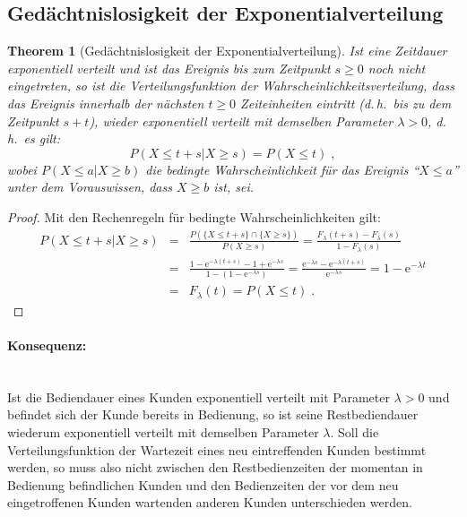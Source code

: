 \documentclass[a4paper,11pt,oneside]{article}
\newtheorem{theorem}{Theorem}
\theoremstyle{definition}
\begin{document}
\subsection{Gedächtnislosigkeit der Exponentialverteilung}

\begin{theorem}[Gedächtnislosigkeit der Exponentialverteilung]
Ist eine Zeitdauer exponentiell verteilt und ist das Ereignis bis zum Zeitpunkt $s\ge0$ noch nicht eingetreten, so ist die Verteilungsfunktion der Wahrscheinlichkeitsverteilung, dass das Ereignis innerhalb der nächsten $t\ge0$ Zeiteinheiten eintritt (d.\,h.\ bis zu dem Zeitpunkt $s+t$), wieder exponentiell verteilt mit demselben Parameter $\lambda>0$, d.\,h.\ es gilt:
\begin{equation}\label{eq:DefinitionMemorylessness}
P(X\le t+s | X\ge s)=P(X\le t)\;,
\end{equation}
wobei $P(X\le a| X\ge b)$ die bedingte Wahrscheinlichkeit für das Ereignis "`$X\le a$"' unter dem Vorauswissen, dass $X\ge b$ ist, sei.
\end{theorem}

\begin{proof}
Mit den Rechenregeln für bedingte Wahrscheinlichkeiten gilt:
\begin{eqnarray*}
P(X\le t+s | X\ge s)&=&
\frac{P(\{X\le t+s\}\cap\{X\ge s\})}{P(X\ge s)}=
\frac{F_\lambda(t+s)-F_\lambda(s)}{1-F_\lambda(s)}\\&=&
\frac{1-\mathrm{e}^{-\lambda(t+s)}-1+\mathrm{e}^{-\lambda s}}{1-(1-\mathrm{e}^{-\lambda s})}=
\frac{\mathrm{e}^{-\lambda s}-\mathrm{e}^{-\lambda(t+s)}}{\mathrm{e}^{-\lambda s}}=
1-\mathrm{e}^{-\lambda t}\\&=&
F_\lambda(t)=
P(X\le t)\;.
\end{eqnarray*}
\end{proof}

\paragraph{Konsequenz:}~\\
Ist die Bediendauer eines Kunden exponentiell verteilt mit Parameter $\lambda>0$ und befindet sich der Kunde bereits in Bedienung, so ist seine Restbediendauer wiederum exponentiell verteilt mit demselben Parameter $\lambda$. Soll die Verteilungsfunktion der Wartezeit eines neu eintreffenden Kunden bestimmt werden, so muss also nicht zwischen den Restbedienzeiten der momentan in Bedienung befindlichen Kunden und den Bedienzeiten der vor dem neu eingetroffenen Kunden wartenden anderen Kunden unterschieden werden.
\end{document}
